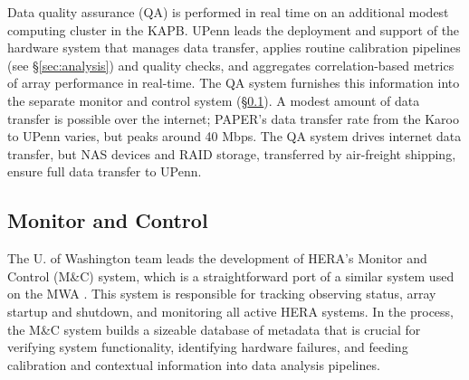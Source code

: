 \documentclass[ars]{/Users/daviddeboer1/Documents/Papers/Copernicus_LaTeX_Package_v_2_7/copernicus}
\begin{document}
Data quality assurance (QA) is performed in real time on an additional modest 
computing cluster in the
KAPB.  UPenn leads the deployment and support of the hardware system that
manages data transfer, applies routine calibration pipelines (see \S\ref{sec:analysis}) and quality
checks, and aggregates correlation-based metrics of array performance in real-time.  The QA system
furnishes this information into the separate monitor and control system (\S\ref{sec:monitor}).
A modest amount of data transfer is possible over the internet; PAPER's data transfer rate from the Karoo
to UPenn varies, but peaks around 40 Mbps.  The QA system drives internet data transfer, but
NAS devices and RAID storage, transferred by air-freight shipping, ensure full data transfer to UPenn.




\subsection{Monitor and Control}
\label{sec:monitor}

The U. of Washington team leads the development of HERA's Monitor and Control (M\&C) system,
which is a straightforward port of a similar system used on the MWA \citep{tingay_et_al2013}.
This system is
responsible for tracking observing status, array startup and shutdown, and
monitoring all active HERA systems. In the process, the M\&C system builds a sizeable database of 
metadata that is crucial for verifying system functionality, identifying hardware failures, and feeding
calibration and contextual information into data analysis pipelines.  
\end{document}
